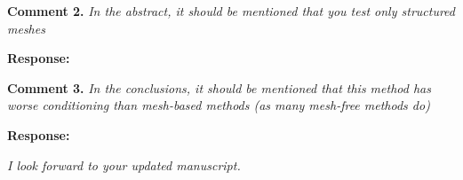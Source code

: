\documentclass{article}
\begin{document}
\textbf{Comment 2.} \textit{ In the abstract, it should be mentioned that you test only structured meshes}

\textbf{Response:} 

\textbf{Comment 3.} \textit{In the conclusions, it should be mentioned that this method has worse conditioning than mesh-based methods (as many mesh-free methods do)}

\textbf{Response:}

\textit{I look forward to your updated manuscript.}


% 
\end{document}
